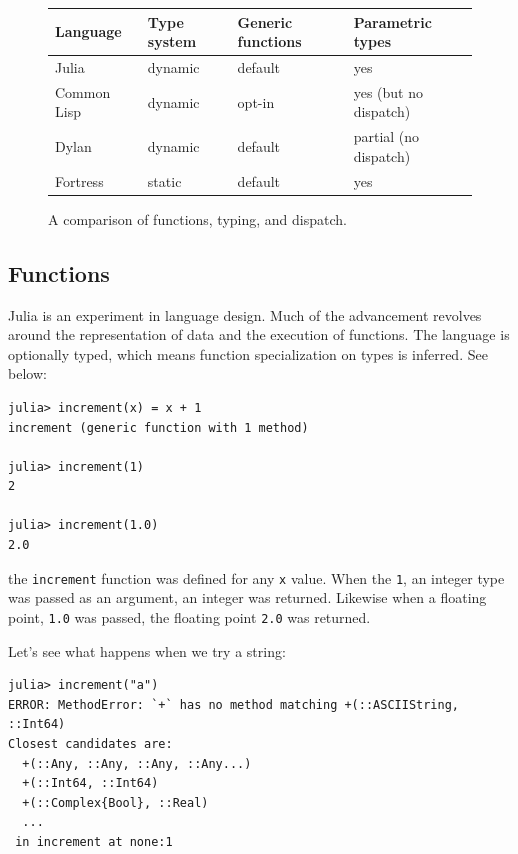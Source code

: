 \documentclass[a4paper]{article}
\begin{document}
\begin{figure}[h!]
  \label{tab:types}
  \centering
    \caption{A comparison of functions, typing, and dispatch.}
    \begin{tabular}{ l | l l l}
    Language & Type system & Generic functions & Parametric types \\
    \hline
    Julia & dynamic & default & yes \\
    Common Lisp & dynamic & opt-in & yes (but no dispatch) \\
    Dylan & dynamic & default & partial (no dispatch) \\
    Fortress & static & default & yes \\
    \end{tabular}
\end{figure}


\subsection{Functions}
Julia is an experiment in language design. Much of the advancement
revolves around the representation of data and the execution of functions.
The language is optionally typed, which means function specialization on types
is inferred. See below:
\begin{lstlisting}
julia> increment(x) = x + 1
increment (generic function with 1 method)

julia> increment(1)
2

julia> increment(1.0)
2.0
\end{lstlisting}
the \texttt{increment} function was defined for any \texttt{x} value. When the
\texttt{1}, an
integer type was passed as an argument, an integer was returned. Likewise
when a floating point, \texttt{1.0} was passed, the floating point
\texttt{2.0} was returned.

Let's see what happens when we try a string:
\begin{lstlisting}
julia> increment("a")
ERROR: MethodError: `+` has no method matching +(::ASCIIString, ::Int64)
Closest candidates are:
  +(::Any, ::Any, ::Any, ::Any...)
  +(::Int64, ::Int64)
  +(::Complex{Bool}, ::Real)
  ...
 in increment at none:1
\end{lstlisting}
\end{document}
